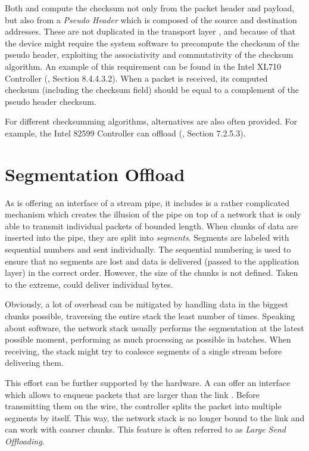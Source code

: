 Both  and  compute the checksum not only from the packet header
and payload, but also from a \emph{Pseudo Header} which is composed of the source and
destination addresses.
These are not duplicated in the transport layer , and because of that
the device might require the system software to precompute the checksum of the pseudo
header, exploiting the associativity and commutativity of the checksum
algorithm. An example of this requirement can be found in the Intel XL710
Controller (\cite{XL710}, Section 8.4.4.3.2). When a packet is received, its
computed checksum (including the checksum field) should be equal to
a complement of the pseudo header checksum.

For different checksumming algorithms, alternatives are also often provided.
For example, the Intel 82599 Controller can offload  
(\cite{82599}, Section 7.2.5.3).

\section{ Segmentation Offload}

As  is offering an interface of a stream pipe, it includes is a rather
complicated mechanism which creates the illusion of the pipe on top of a network that is only able to
transmit individual packets of bounded length.
When chunks of data are inserted into the pipe, they are split into \emph{segments}.
Segments are labeled with sequential numbers and sent individually. The
sequential numbering is used to ensure that no segments are lost and data is
delivered (passed to the application layer) in the correct order.
However, the size of the chunks is not defined. Taken to the extreme, 
could deliver individual bytes.

Obviously, a lot of overhead can be mitigated by handling data in the biggest chunks
possible, traversing the entire stack the least number of times. Speaking about
software, the network stack usually performs the segmentation at the latest
possible moment, performing as much processing as possible in batches. When receiving, the stack
might try to coalesce segments of a single  stream before delivering them.

This effort can be further supported by the hardware. A  can offer an
interface which allows to enqueue  packets that are larger than the link
. Before transmitting them on the wire, the controller splits the packet
into multiple segments by itself. This way, the network stack is no longer
bound to the link  and can work with coarser chunks. This feature is
often referred to as \emph{Large Send Offloading}.


